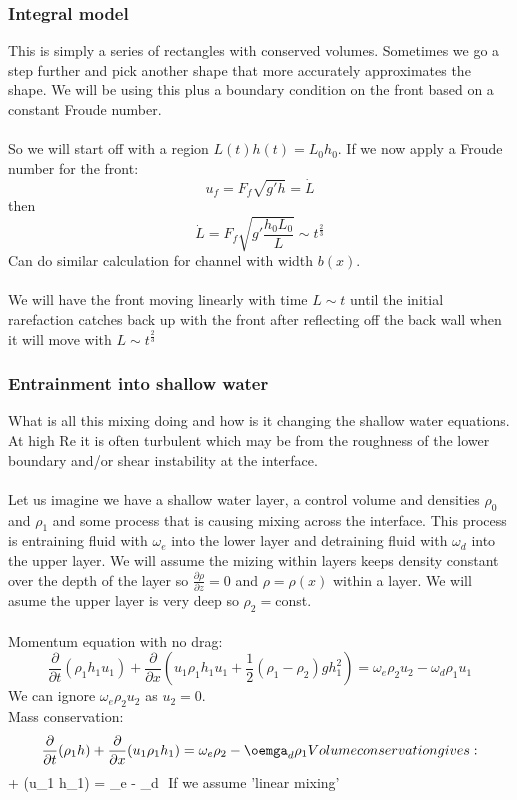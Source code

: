 \documentclass{article}
\begin{document}
         \subsubsection{Integral model}
         This is simply a series of rectangles with conserved volumes. Sometimes we go a step further and pick another shape that more accurately approximates the shape. We will be using this plus a boundary condition on the front based on a constant Froude number.\\\\
         So we will start off with a region $L(t)h(t) = L_0  h_0$. If we now apply a Froude number for the front:
         $$
          u_f = F_f \sqrt{g' h} = \dot L
         $$
         then 
         $$
          \dot L = F_f \sqrt{ g' \frac{h_0 L_0}{L}} \sim t^{\frac{2}{3}}
         $$
         Can do similar calculation for channel with width $b(x)$.\\\\
         We will have the front moving linearly with time $L \sim t$ until the initial rarefaction catches back up with the front after reflecting off the back wall when it will move with $L \sim t^{\frac{2}{3}}$
         \subsubsection{Entrainment into shallow water}
         What is all this mixing doing and how is it changing the shallow water equations. At high Re it is often turbulent which may be from the roughness of the lower boundary and/or shear instability at the interface. \\\\
         Let us imagine we have a shallow water layer, a control volume and densities $\rho_0$ and $\rho_1$ and some process that is causing mixing across the interface. This process is entraining fluid with $\omega_e$ into the lower layer and detraining fluid with $\omega_d$ into the upper layer. We will assume the mizing within layers keeps density constant over the depth of the layer so $\frac{\partial \rho}{\partial z} = 0$ and $\rho = \rho(x)$ within a layer. We will asume the upper layer is very deep so $\rho_2 = $const.\\\\
         Momentum equation with no drag:
         $$
          \frac{\partial}{\partial t} ( \rho_1 h_1 u_1) + \frac{\partial }{\partial x} ( u_1 \rho_1 h_1 u_1 + \frac{1}{2} (\rho_1 - \rho_2) g h_1^2) = \omega_e \rho_2 u_2 - \omega_d \rho_1 u_1
         $$
         We can ignore $\omega_e \rho_2 u_2$ as $u_2 = 0$.\\
         Mass conservation:
$$
 \frac{\partial}{\partial t} ( \rho_1 h) + \frac{\partial }{\partial x} ( u_1 \rho_1 h_1) = \omega_e \rho_2 - \oemga_d \rho_1
         Volume conservation gives:
         $$
           +  (u_1 h_1) = \omega_e - \omega_d
         $$
         If we assume 'linear mixing'
\end{document}
